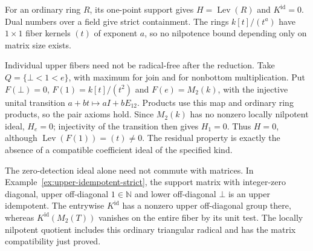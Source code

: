 \begin{example}
\label{ex:levitzki-boundary}
For an ordinary ring $R$, its one-point support gives
$H=\operatorname{Lev}(R)$ and $K^{\mathrm{id}}=0$. Dual numbers over
a field give strict containment. The rings $k[t]/(t^a)$ have
$1\times1$ fiber kernels $(t)$ of exponent $a$, so no nilpotence
bound depending only on matrix size exists.

Individual upper fibers need not be radical-free after the reduction.
Take $Q=\{\bot<1<e\}$, with maximum for join and for nonbottom
multiplication. Put $F(\bot)=0$, $F(1)=k[t]/(t^2)$ and
$F(e)=M_2(k)$, with the injective unital transition
$a+bt\mapsto aI+bE_{12}$. Products use this map and ordinary ring
products, so the pair axioms hold. Since $M_2(k)$ has no nonzero
locally nilpotent ideal, $H_e=0$; injectivity of the transition then
gives $H_1=0$. Thus $H=0$, although
$\operatorname{Lev}(F(1))=(t)\ne0$. The residual property is exactly
the absence of a compatible coefficient ideal of the specified kind.
\end{example}

The zero-detection ideal alone need not commute with matrices. In
Example~\ref{ex:upper-idempotent-strict}, the support matrix with
integer-zero diagonal, upper off-diagonal $1\in\mathbb N$ and lower
off-diagonal $\bot$ is an upper idempotent. The entrywise
$K^{\mathrm{id}}$ has a nonzero upper off-diagonal group there,
whereas $K^{\mathrm{id}}(M_2(T))$ vanishes on the entire fiber by its
unit test. The locally nilpotent quotient includes this ordinary
triangular radical and has the matrix compatibility just proved.

